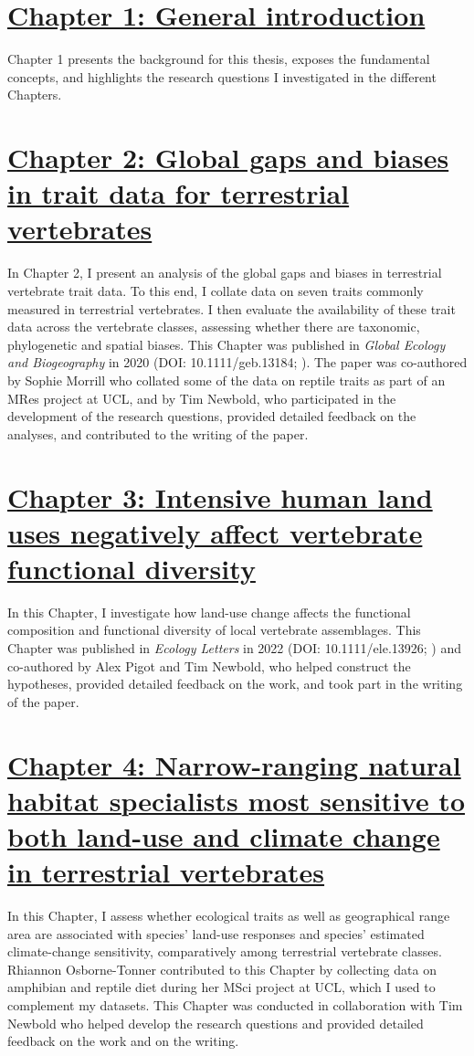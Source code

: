 
\section*{\hyperref[sec:1]{Chapter 1: General introduction}}
Chapter 1 presents the background for this thesis, exposes the fundamental concepts, and highlights the research questions I investigated in the different Chapters.

\section*{\hyperref[sec:2]{Chapter 2: Global gaps and biases in trait data for terrestrial vertebrates}}
In Chapter 2, I present an analysis of the global gaps and biases in terrestrial vertebrate trait data. To this end, I collate data on seven traits commonly measured in terrestrial vertebrates. I then evaluate the availability of these trait data across the vertebrate classes, assessing whether there are taxonomic, phylogenetic and spatial biases. This Chapter was published in \textit{Global Ecology and Biogeography} in 2020 (DOI: 10.1111/geb.13184; \citet{Etard2020}). The paper was co-authored by Sophie Morrill who collated some of the data on reptile traits as part of an MRes project at UCL, and by Tim Newbold, who participated in the development of the research questions, provided detailed feedback on the analyses, and contributed to the writing of the paper. 

\section*{\hyperref[sec:3]{Chapter 3: Intensive human land uses negatively affect vertebrate functional diversity}}
In this Chapter, I investigate how land-use change affects the functional composition and functional diversity  of local vertebrate assemblages. This Chapter was published in \textit{Ecology Letters} in 2022  (DOI: 10.1111/ele.13926; \citet{Etard2022}) and co-authored by Alex Pigot and Tim Newbold, who helped construct the hypotheses, provided detailed feedback on the work, and took part in the writing of the paper.

\section*{\hyperref[sec:4]{Chapter 4: Narrow-ranging natural habitat specialists most sensitive to both land-use and climate change in terrestrial vertebrates}}
In this Chapter, I assess whether ecological traits as well as geographical range area are associated with species' land-use responses and species' estimated climate-change sensitivity, comparatively among terrestrial vertebrate classes. Rhiannon Osborne-Tonner contributed to this Chapter by collecting data on amphibian and reptile diet during her MSci project at UCL, which I used to complement my datasets. This Chapter was conducted in collaboration with Tim Newbold who helped develop the research questions and provided detailed feedback on the work and on the writing.  %

